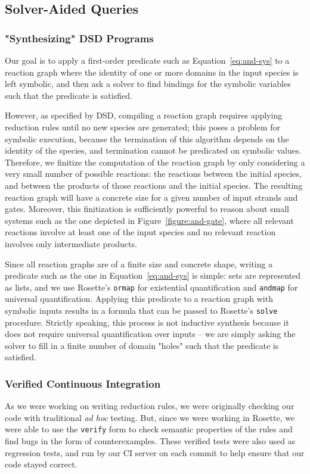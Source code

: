 \documentclass{article}
\begin{document}
\subsection{Solver-Aided Queries}
\subsubsection{"Synthesizing" DSD Programs}
Our goal is to apply a first-order predicate such as Equation~\ref{eq:and-sys}
to a reaction graph where the identity of one or more domains in the input
species is left symbolic, and then ask a solver to find bindings for the
symbolic variables such that the predicate is satisfied.

However, as specified by DSD, compiling a reaction graph requires applying
reduction rules until no new species are generated; this poses a problem
for symbolic execution, because the termination of this algorithm
depends on the identity of the species, and termination cannot be
predicated on symbolic values. Therefore, we finitize the computation
of the reaction graph by only considering a very small number of possible
reactions: the reactions between the initial species, and between
the products of those reactions and the initial species. The
resulting reaction graph will have a concrete size for a given
number of input strands and gates. Moreover, this finitization
is sufficiently powerful to reason about small systems such as the one
depicted in Figure~\ref{figure:and-gate}, where all relevant reactions
involve at least one of the input species and no relevant reaction
involves only intermediate products.

Since all reaction graphs are of a finite size and concrete shape,
writing a predicate such as the one in Equation~\ref{eq:and-sys} is
simple: sets are represented as lists, and we use Rosette's \verb;ormap; for
existential quantification and \verb;andmap; for universal quantification.
Applying this predicate to a reaction graph with symbolic inputs results
in a formula that can be passed to Rosette's \verb;solve; procedure.
Strictly speaking, this process is not inductive synthesis because it
does not require universal quantification over inputs -- we are simply
asking the solver to fill in a finite number of domain "holes" such that the
predicate is satisfied.

\subsubsection{Verified Continuous Integration}
As we were working on writing reduction rules, we were originally
checking our code with traditional \emph{ad hoc} testing. But,
since we were working in Rosette, we were able to use the \verb;verify;
form to check semantic properties of the rules and find bugs in the
form of counterexamples.  These verified tests were also used as regression
tests, and run by our CI server on each commit to help ensure that our code
stayed correct.
\end{document}
